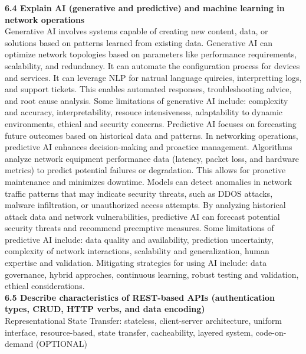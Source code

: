 \documentclass{article}
\begin{document}
\noindent\textbf{6.4 Explain AI (generative and predictive) and machine learning in network operations}\\
	
	Generative AI involves systems capable of creating new content, data, or solutions based on patterns learned from existing data. Generative AI can optimize network topologies based on parameters like performance requirements, scalability, and redundancy. It can automate the configuration process for devices and services. It can leverage NLP for natrual language quireies, interpretting logs, and support tickets. This enables automated responses, troubleshooting advice, and root cause analysis. Some limitations of generative AI include: complexity and accuracy, interpretability, resouce intensiveness, adaptability to dynamic environments, ethical and security concerns. Predictive AI focuses on forecasting future outcomes based on historical data and patterns. In networking operations, predictive AI enhances decision-making and proactice management. Algorithms analyze network equipment performance data (latency, packet loss, and hardware metrics) to predict potential failures or degradation. This allows for proactive maintenance and minimizes downtime. Models can detect anomalies in network traffic patterns that may indicate security threats, such as DDOS attacks, malware infiltration, or unauthorized access attempts. By analyzing historical attack data and network vulnerabilities, predictive AI can forecast potential security threats and recommend preemptive measures. Some limitations of predictive AI include: data quality and availability, prediction uncertainty, complexity of network interactions, scalability and generalization, human expertise and validation. Mitigating strategies for using AI include: data governance, hybrid approches, continuous learning, robust testing and validation, ethical considerations.\\
	
\noindent\textbf{6.5 Describe characteristics of REST-based APIs (authentication types, CRUD, HTTP verbs, and data encoding)}\\

Representational State Transfer: stateless, client-server architecture, uniform interface, resource-based, state transfer, cacheability, layered system, code-on-demand (OPTIONAL)\\
\end{document}
